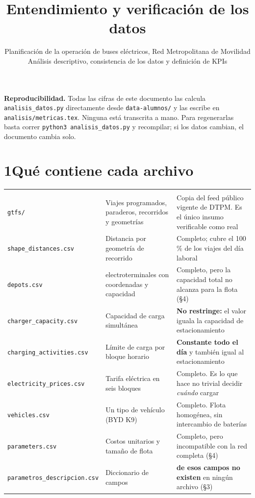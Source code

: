 \documentclass[11pt,a4paper,parskip=half]{scrartcl}
\title{Entendimiento y verificación de los datos}
\subtitle{\normalsize Planificación de la operación de buses eléctricos, Red Metropolitana de Movilidad\\[2pt]
Análisis descriptivo, consistencia de los datos y definición de KPIs}
\author{}
\date{}
\begin{document}
\maketitle
\vspace{-2.2\baselineskip}

\begin{nota}
\textbf{\textcolor{ink}{Reproducibilidad.}} Todas las cifras de este documento las calcula \texttt{analisis\_datos.py} directamente desde \texttt{data-alumnos/} y las escribe en \texttt{analisis/metricas.tex}. Ninguna está transcrita a mano. Para regenerarlas basta correr \texttt{python3 analisis\_datos.py} y recompilar; si los datos cambian, el documento cambia solo.
\end{nota}

\section*{1\quad Qué contiene cada archivo}

\begin{longtable}{@{}L{4.0cm}L{4.1cm}L{7.2cm}@{}}
 &  &  \\
\endfirsthead
{}
 &  &  \\
\endhead
\midrule
\texttt{gtfs/} & Viajes programados, paraderos, recorridos y geometrías & Copia del feed público vigente de DTPM. Es el único insumo verificable como real \\
\texttt{shape\_distances.csv} & Distancia por geometría de recorrido & Completo; cubre el 100\,\% de los viajes del día laboral \\
\texttt{depots.csv} & \numElectroterminales{} electroterminales con coordenadas y capacidad & Completo, pero la capacidad total no alcanza para la flota (§4) \\
\texttt{charger\_capacity.csv} & Capacidad de carga simultánea & \textbf{No restringe:} el valor iguala la capacidad de estacionamiento \\
\texttt{charging\_activities.csv} & Límite de carga por bloque horario & \textbf{Constante todo el día} y también igual al estacionamiento \\
\texttt{electricity\_prices.csv} & Tarifa eléctrica en seis bloques & Completo. Es lo que hace no trivial decidir \emph{cuándo} cargar \\
\texttt{vehicles.csv} & Un tipo de vehículo (BYD K9) & Completo. Flota homogénea, sin intercambio de baterías \\
\texttt{parameters.csv} & Costos unitarios y tamaño de flota & Completo, pero incompatible con la red completa (§4) \\
\texttt{parametros\_descripcion.csv} & Diccionario de \camposDocumentados{} campos & \textbf{\camposAusentes{} de esos campos no existen} en ningún archivo (§3) \\
\bottomrule
\end{longtable}
\end{document}
